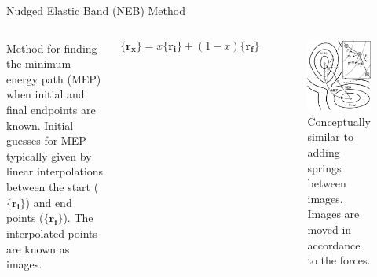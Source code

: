 \documentclass[aspectratio=169]{beamer}
\let \vec \mathbf
\begin{document}
    \begin{frame}{Nudged Elastic Band (NEB) Method}
        \begin{columns}
            Method for finding the minimum energy path (MEP) when initial and final endpoints are known.\newline
            \newline
            Initial guesses for MEP typically given by linear interpolations between the start ($\{\vec{r_i}\}$) and end points ($\{\vec{r_f}\}$). The interpolated points are known as images.

            \begin{equation*}
                \{\vec{r_x}\} = x \{\vec{r_i}\} + (1-x)\{\vec{r_f}\}
            \end{equation*}
            \begin{figure}
                \centering
                \includegraphics[width=0.55\linewidth]{lectures/figures/12_NEB.png}
                \caption{Conceptually similar to adding springs between images. Images are moved in accordance to the forces.\cite{henkelmanClimbingImageNudged2000}}
            \end{figure}
        \end{columns}
    \end{frame}
\end{document}
